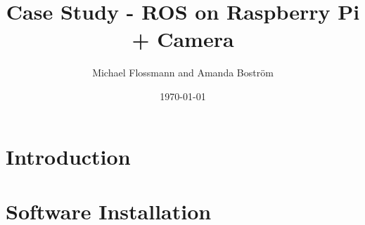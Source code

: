 \documentclass[10pt,a4paper, singlespace]{article}
\author{Michael Flossmann and Amanda Boström}
\title{Case Study - ROS on Raspberry Pi + Camera}
\date{\today}
\begin{document}
\maketitle

\section*{Introduction}

\section*{Software Installation}
\end{document}
